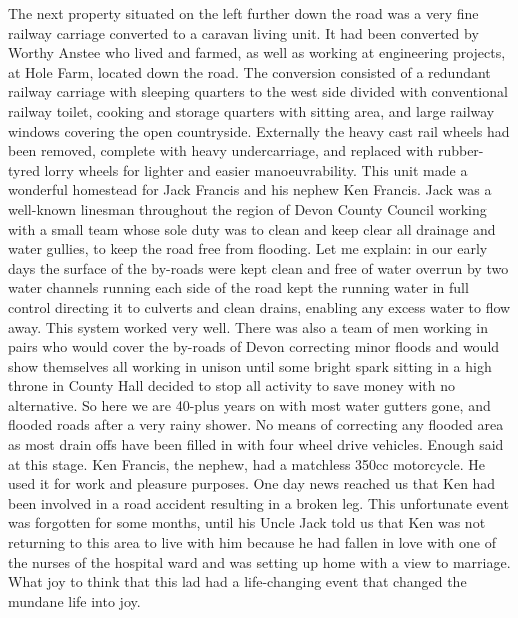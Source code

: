 The next property situated on the left further down the road was a very fine
railway carriage converted to a caravan living unit. It had been converted by
Worthy Anstee who lived and farmed, as well as working at engineering projects,
at Hole Farm, located down the road. The conversion consisted of a redundant
railway carriage with sleeping quarters to the west side divided with
conventional railway toilet, cooking and storage quarters with sitting area,
and large railway windows covering the open countryside. Externally the heavy
cast rail wheels had been removed, complete with heavy undercarriage, and
replaced with rubber-tyred lorry wheels for lighter and easier manoeuvrability.
This unit made a wonderful homestead for Jack Francis and his nephew Ken
Francis. Jack was a well-known linesman throughout the region of Devon County
Council working with a small team whose sole duty was to clean and keep clear
all drainage and water gullies, to keep the road free from flooding. Let me
explain: in our early days the surface of the by-roads were kept clean and free
of water overrun by two water channels running each side of the road kept the
running water in full control directing it to culverts and clean drains,
enabling any excess water to flow away. This system worked very well. There was
also a team of men working in pairs who would cover the by-roads of Devon
correcting minor floods and would show themselves all working in unison until
some bright spark sitting in a high throne in County Hall decided to stop all
activity to save money with no alternative. So here we are 40-plus years on
with most water gutters gone, and flooded roads after a very rainy shower. No
means of correcting any flooded area as most drain offs have been filled in
with four wheel drive vehicles. Enough said at this stage. Ken Francis, the
nephew, had a matchless 350cc motorcycle. He used it for work and pleasure
purposes. One day news reached us that Ken had been involved in a road accident
resulting in a broken leg. This unfortunate event was forgotten for some
months, until his Uncle Jack told us that Ken was not returning to this area to
live with him because he had fallen in love with one of the nurses of the
hospital ward and was setting up home with a view to marriage. What joy to
think that this lad had a life-changing event that changed the mundane life
into joy.

